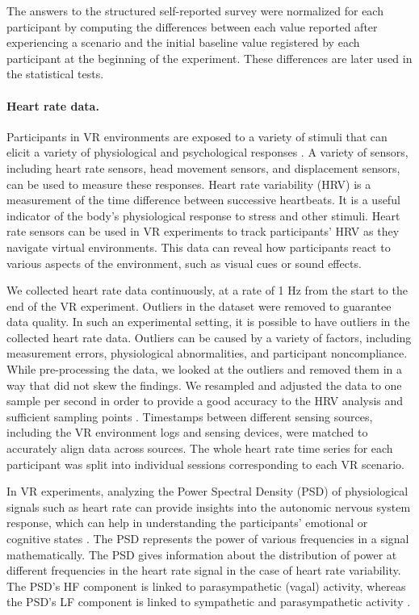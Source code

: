 The answers to the structured self-reported survey were normalized for each participant by computing the differences between each value reported after experiencing a scenario and the initial baseline value registered by each participant at the beginning of the experiment. These differences are later used in the statistical tests.


\paragraph{Heart rate data.}\label{subsec:heart_rate_data}
Participants in VR environments are exposed to a variety of stimuli that can elicit a variety of physiological and psychological responses \cite{martens2019feels}. A variety of sensors, including heart rate sensors, head movement sensors, and displacement sensors, can be used to measure these responses. Heart rate variability (HRV) is a measurement of the time difference between successive heartbeats. It is a useful indicator of the body's physiological response to stress and other stimuli. Heart rate sensors can be used in VR experiments to track participants' HRV as they navigate virtual environments. This data can reveal how participants react to various aspects of the environment, such as visual cues or sound effects.

We collected heart rate data continuously, at a rate of 1 Hz from the start to the end of the VR experiment. Outliers in the dataset were removed to guarantee data quality. In such an experimental setting, it is possible to have outliers in the collected heart rate data. Outliers can be caused by a variety of factors, including measurement errors, physiological abnormalities, and participant noncompliance. While pre-processing the data, we looked at the outliers and removed them in a way that did not skew the findings. We resampled and adjusted the data to one sample per second \cite{Chen2018, Shintomi2022, Nishikawa2018, Antoniou2020} in order to provide a good accuracy to the HRV analysis and sufficient sampling points \cite{Brisinda2020}. Timestamps between different sensing sources, including the VR environment logs and sensing devices, were matched to accurately align data across sources. The whole heart rate time series for each participant was split into individual sessions corresponding to each VR scenario. 

In VR experiments, analyzing the Power Spectral Density (PSD) of physiological signals such as heart rate can provide insights into the autonomic nervous system response, which can help in understanding the participants' emotional or cognitive states \cite{kamath1993power,anderson2017relaxation}. The PSD represents the power of various frequencies in a signal mathematically. The PSD gives information about the distribution of power at different frequencies in the heart rate signal in the case of heart rate variability. The PSD's HF component is linked to parasympathetic (vagal) activity, whereas the PSD's LF component is linked to sympathetic and parasympathetic activity \cite{montano1994power}. 

